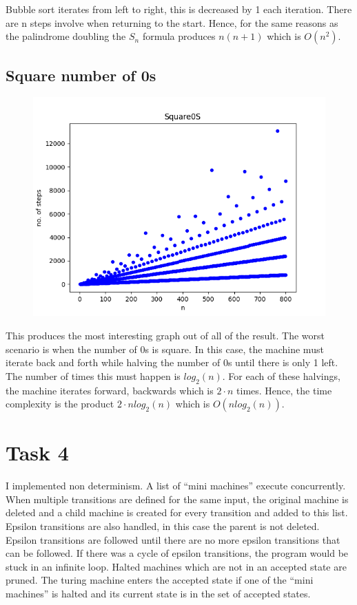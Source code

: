 \documentclass{article}
\begin{document}
Bubble sort iterates from left to right, this is decreased by 1 each iteration. There are n steps involve when returning to the start. Hence, for the same reasons as the palindrome doubling the $S_n$ formula produces $ n (n + 1) $ which is $O(n^2)$.

\subsection{Square number of 0s}

\begin{figure}[!htb]
  \caption{}
  \centering
  \includegraphics[scale=0.50]{images/square0s_graph.png}
\end{figure}

This produces the most interesting graph out of all of the result. The worst scenario is when the number of 0s is square. In this case, the machine must iterate back and forth while halving the number of 0s until there is only 1 left. The number of times this must happen is $log_2(n)$. For each of these halvings, the machine iterates forward, backwards which is $2 \cdot n$ times. Hence, the time complexity is the product $2 \cdot n log_2(n) $ which is $O(nlog_2(n))$.

\section{Task 4}

I implemented non determinism. A list of ``mini machines'' execute concurrently. When multiple transitions are defined for the same input, the original machine is deleted and a child machine is created for every transition and added to this list. Epsilon transitions are also handled, in this case the parent is not deleted. Epsilon transitions are followed until there are no more epsilon transitions that can be followed. If there was a cycle of epsilon transitions, the program would be stuck in an infinite loop. Halted machines which are not in an accepted state are pruned. The turing machine enters the accepted state if one of the ``mini machines'' is halted and its current state is in the set of accepted states.
\end{document}
